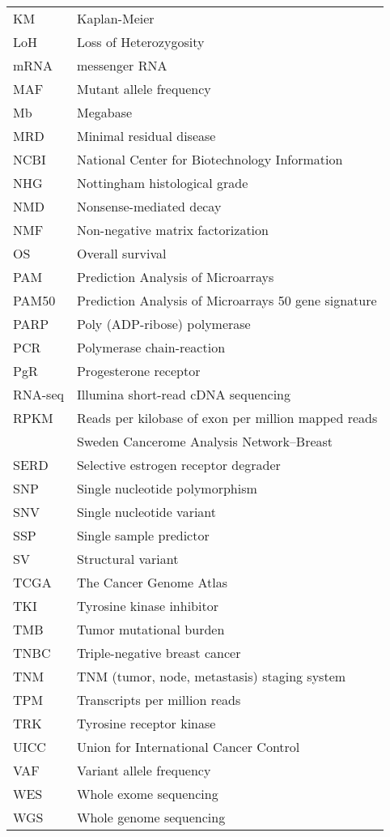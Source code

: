 {\begin{longtabu}{lX}
KM         & Kaplan-Meier \\
LoH        & Loss of Heterozygosity \\
mRNA       & messenger RNA \\
MAF        & Mutant allele frequency \\
Mb         & Megabase \\
MRD        & Minimal residual disease \\
NCBI       & National Center for Biotechnology Information \\
NHG        & Nottingham histological grade \\
NMD        & Nonsense-mediated decay \\
NMF        & Non-negative matrix factorization \\
OS         & Overall survival \\
PAM        & Prediction Analysis of Microarrays \\
PAM50      & Prediction Analysis of Microarrays 50 gene signature \\
PARP       & Poly (ADP-ribose) polymerase \\
PCR        & Polymerase chain-reaction \\
PgR        & Progesterone receptor \\
RNA-seq    & Illumina short-read cDNA sequencing \\
RPKM       & Reads per kilobase of exon per million mapped reads \\
\scanb{}   & Sweden Cancerome Analysis Network--Breast \\
SERD       & Selective estrogen receptor degrader \\
SNP        & Single nucleotide polymorphism \\
SNV        & Single nucleotide variant \\
SSP        & Single sample predictor \\
SV         & Structural variant \\
TCGA       & The Cancer Genome Atlas \\
TKI        & Tyrosine kinase inhibitor \\
TMB        & Tumor mutational burden \\
TNBC       & Triple-negative breast cancer \\
TNM        & TNM (tumor, node, metastasis) staging system \\
TPM        & Transcripts per million reads \\
TRK        & Tyrosine receptor kinase \\
UICC       & Union for International Cancer Control \\
VAF        & Variant allele frequency \\
WES        & Whole exome sequencing \\
WGS        & Whole genome sequencing \\
\end{longtabu}
}